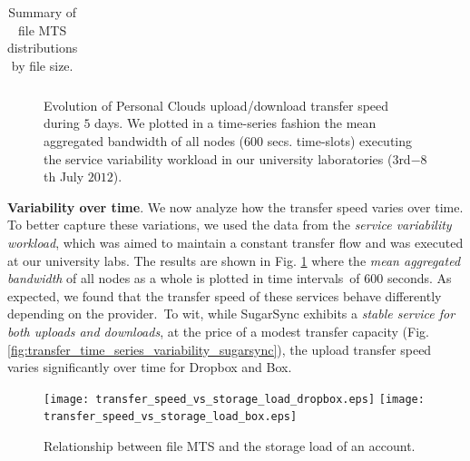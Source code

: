 \begin{table}
\begin{tabular}{|p{0.55cm}|c|c|c|c|c|c|c|c|c|c|c|c|c|c|c|c|c|}
\end{tabular}
\caption{Summary of file MTS distributions by file size.}
\vspace{-8.5mm}
\label{tab:service_variability_file_size}
\end{table}

\begin{figure}

   \caption{Evolution of Personal Clouds upload/download transfer speed during $5$ days. We plotted
   in a time-series fashion the mean aggregated bandwidth of all nodes ($600$ secs. time-slots) executing 
   the service variability workload in our university laboratories ($3$rd$-8$th July $2012$).}
   \label{fig:transfer_time_series_variability}
	\vspace{-3mm}
\end{figure}


\medskip

\noindent\textbf{Variability over time}. We now analyze how the
transfer speed varies over time. To better capture these variations, 
we used the data from the \textit{service variability workload}, 
which was aimed to maintain a constant transfer flow and was executed at our university labs.
The results are shown in Fig. \ref{fig:transfer_time_series_variability} 
where the \textit{mean aggregated bandwidth} of all nodes as a whole is plotted in time 
intervals~of $600$ seconds. As expected, we found that the transfer speed of these services behave
differently depending on the provider.~To wit, while SugarSync
exhibits a \textit{stable service for both uploads and downloads}, at
the price of a modest transfer capacity (Fig. \ref{fig:transfer_time_series_variability_sugarsync}), the upload transfer
speed varies significantly over time for Dropbox and Box.

\begin{figure}	  
\texttt{[image: transfer\_speed\_vs\_storage\_load\_dropbox.eps]}
\texttt{[image: transfer\_speed\_vs\_storage\_load\_box.eps]}
	\vspace{-2mm}
	\caption{Relationship between file MTS and the storage load of an account.}
	
	\label{fig:transfer_speed_vs_storage_load}
	\vspace{-5mm}
\end{figure}

